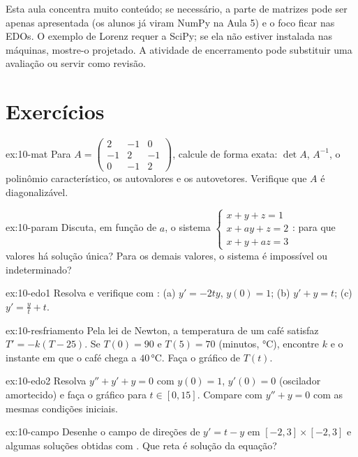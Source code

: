 \begin{professor}
Esta aula concentra muito conteúdo; se necessário, a parte de matrizes pode ser apenas apresentada (os alunos já
viram NumPy na Aula 5) e o foco ficar nas EDOs. O exemplo de Lorenz requer a SciPy; se ela não estiver instalada
nas máquinas, mostre-o projetado. A atividade de encerramento pode substituir uma avaliação ou servir como
revisão.
\end{professor}

\section{Exercícios}

\begin{exercicio}[matrizes]{ex:10-mat}
Para $A=\begin{pmatrix}2&-1&0\\-1&2&-1\\0&-1&2\end{pmatrix}$, calcule de forma exata: $\det A$, $A^{-1}$, o
polinômio característico, os autovalores e os autovetores. Verifique que $A$ é diagonalizável.
\end{exercicio}

\begin{exercicio}{ex:10-param}
Discuta, em função de $a$, o sistema $\begin{cases}x+y+z=1\\x+ay+z=2\\x+y+az=3\end{cases}$: para que valores há
solução única? Para os demais valores, o sistema é impossível ou indeterminado?
\end{exercicio}

\begin{exercicio}{ex:10-edo1}
Resolva e verifique com : (a) $y'=-2ty$, $y(0)=1$; (b) $y'+y=t$; (c) $y'=\frac{y}{t}+t$.
\end{exercicio}

\begin{exercicio}{ex:10-resfriamento}
Pela lei de Newton, a temperatura de um café satisfaz $T'=-k(T-25)$. Se $T(0)=90$ e $T(5)=70$ (minutos, °C),
encontre $k$ e o instante em que o café chega a $40$\,°C. Faça o gráfico de $T(t)$.
\end{exercicio}

\begin{exercicio}{ex:10-edo2}
Resolva $y''+y'+y=0$ com $y(0)=1$, $y'(0)=0$ (oscilador amortecido) e faça o gráfico para $t\in[0,15]$.
Compare com $y''+y=0$ com as mesmas condições iniciais.
\end{exercicio}

\begin{exercicio}{ex:10-campo}
Desenhe o campo de direções de $y'=t-y$ em $[-2,3]\times[-2,3]$ e algumas soluções obtidas com . Que reta
é solução da equação?
\end{exercicio}
